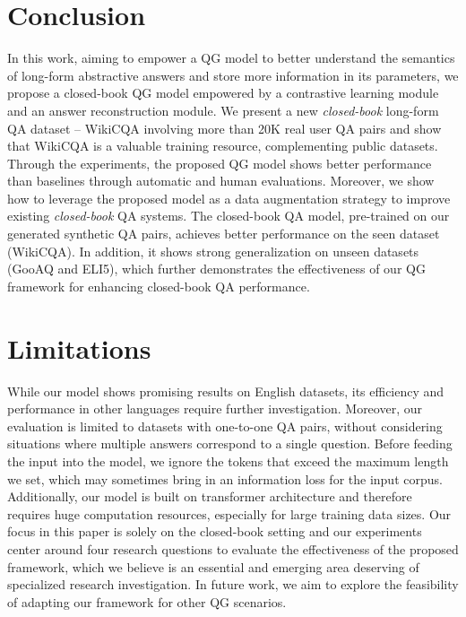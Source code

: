 \documentclass[11pt]{article}
\begin{document}
\section{Conclusion}

In this work, aiming to empower a QG model to better understand the semantics of long-form abstractive answers and store more information in its parameters, we propose a closed-book QG model empowered by a contrastive learning module and an answer reconstruction module. We present a new \textit{closed-book} long-form QA dataset -- WikiCQA involving more than 20K real user QA pairs and show that WikiCQA is a valuable training resource, complementing public datasets.
Through the experiments, the proposed QG model shows better performance than baselines through automatic and human evaluations.
Moreover, we show how to leverage the proposed model as a data augmentation strategy to improve existing \textit{closed-book} QA systems.
The closed-book QA model, pre-trained on our generated synthetic QA pairs, achieves better performance on the seen dataset (WikiCQA). In addition, it shows strong generalization on unseen datasets (GooAQ and ELI5), which further demonstrates the effectiveness of our QG framework for enhancing closed-book QA performance. 



\section*{Limitations}
While our model shows promising results on English datasets, its efficiency and performance in other languages require further investigation. Moreover, our evaluation is limited to datasets with one-to-one QA pairs, without considering situations where multiple answers correspond to a single question.
Before feeding the input into the model, we ignore the tokens that exceed the maximum length we set, which may sometimes bring in an information loss for the input corpus.
Additionally, our model is built on transformer architecture and therefore requires huge computation resources, especially for large training data sizes.
Our focus in this paper is solely on the closed-book setting and our experiments center around four research questions to evaluate the effectiveness of the proposed framework, which we believe is an essential and emerging area deserving of specialized research investigation. In future work, we aim to explore the feasibility of adapting our framework for other QG scenarios.
\end{document}
